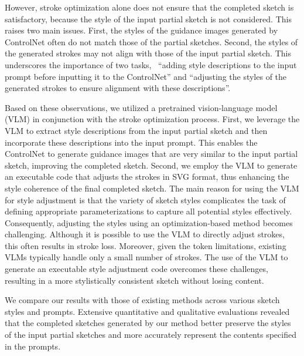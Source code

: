 However, stroke optimization alone does not ensure that the completed sketch is satisfactory, because the style of the input partial sketch is not considered.
This raises two main issues.
First, the styles of the guidance images generated by ControlNet often do not match those of the partial sketches.
Second, the styles of the generated strokes may not align with those of the input partial sketch.
This underscores the importance of two tasks, \ie~``adding style descriptions to the input prompt before inputting it to the ControlNet'' and ``adjusting the styles of the generated strokes to ensure alignment with these descriptions''.


Based on these observations, we utilized a pretrained vision-language model (VLM) in conjunction with the stroke optimization process.
First, we leverage the VLM to extract style descriptions from the input partial sketch and then incorporate these descriptions into the input prompt.
This enables the ControlNet to generate guidance images that are very similar to the input partial sketch, improving the completed sketch.
Second, we employ the VLM to generate an executable code that adjusts the strokes in SVG format, thus enhancing the style coherence of the final completed sketch.
The main reason for using the VLM for style adjustment is that the variety of sketch styles complicates the task of defining appropriate parameterizations to capture all potential styles effectively.
Consequently, adjusting the styles using an optimization-based method becomes challenging.
Although it is possible to use the VLM to directly adjust strokes, this often results in stroke loss.
Moreover, given the token limitations, existing VLMs typically handle only a small number of strokes.
The use of the VLM to generate an executable style adjustment code overcomes these challenges, resulting in a more stylistically consistent sketch without losing content.

We compare our results with those of existing methods across various sketch styles and prompts.
Extensive quantitative and qualitative evaluations revealed that the completed sketches generated by our method better preserve the styles of the input partial sketches and more accurately represent the contents specified in the prompts.







